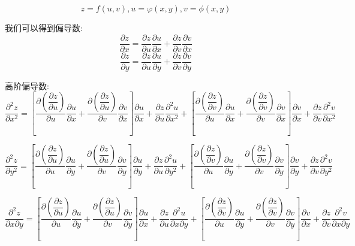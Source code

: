 \begin{definition}[链式法则]\label{def: 链式法则}
	$$z=f(u,v),u=\varphi(x,y),v=\phi(x,y)$$
	
	我们可以得到偏导数: 
	$$\dfrac{\partial z}{\partial x}=\dfrac{\partial z}{\partial u}\dfrac{\partial u}{\partial x}+\dfrac{\partial z}{\partial v}\dfrac{\partial v}{\partial x}$$
	$$\dfrac{\partial z}{\partial y}=\dfrac{\partial z}{\partial u}\dfrac{\partial u}{\partial y}+\dfrac{\partial z}{\partial v}\dfrac{\partial v}{\partial y}$$
	
	高阶偏导数: 
	$$\dfrac{\partial^2 z}{\partial x^2}=\left[\dfrac{\partial (\dfrac{\partial z}{\partial u})}{\partial u}\dfrac{\partial u}{\partial x}+\dfrac{\partial (\dfrac{\partial z}{\partial u})}{\partial v}\dfrac{\partial v}{\partial x}\right]\dfrac{\partial u}{\partial x}+
	\dfrac{\partial z}{\partial u}\frac{\partial ^2u}{\partial x^2}+
	\left[\dfrac{\partial (\dfrac{\partial z}{\partial v})}{\partial u}\dfrac{\partial u}{\partial x}+\dfrac{\partial (\dfrac{\partial z}{\partial v})}{\partial v}\dfrac{\partial v}{\partial x}\right]\dfrac{\partial v}{\partial x}+
	\dfrac{\partial z}{\partial v}\frac{\partial ^2v}{\partial x^2}$$
	
	$$\dfrac{\partial^2 z}{\partial y^2}=\left[\dfrac{\partial (\dfrac{\partial z}{\partial u})}{\partial u}\dfrac{\partial u}{\partial y}+\dfrac{\partial (\dfrac{\partial z}{\partial u})}{\partial v}\dfrac{\partial v}{\partial y}\right]\dfrac{\partial u}{\partial y}+
	\dfrac{\partial z}{\partial u}\dfrac{\partial ^2u}{\partial y^2}+
	\left[\dfrac{\partial (\dfrac{\partial z}{\partial v})}{\partial u}\dfrac{\partial u}{\partial y}+\dfrac{\partial (\dfrac{\partial z}{\partial v})}{\partial v}\dfrac{\partial v}{\partial y}\right]\dfrac{\partial v}{\partial y}+
	\dfrac{\partial z}{\partial v}\dfrac{\partial ^2v}{\partial y^2}$$
	
	$$\dfrac{\partial^2 z}{\partial x\partial y}=\left[\dfrac{\partial (\dfrac{\partial z}{\partial u})}{\partial u}\dfrac{\partial u}{\partial y}+\dfrac{\partial (\dfrac{\partial z}{\partial u})}{\partial v}\dfrac{\partial v}{\partial y}\right]\frac{\partial u}{\partial x}+
	\dfrac{\partial z}{\partial u}\dfrac{\partial ^2u}{\partial x\partial y}+
	\left[\dfrac{\partial (\dfrac{\partial z}{\partial v})}{\partial u}\dfrac{\partial u}{\partial y}+\dfrac{\partial (\dfrac{\partial z}{\partial v})}{\partial v}\dfrac{\partial v}{\partial y}\right]\dfrac{\partial v}{\partial x}+
	\dfrac{\partial z}{\partial v}\dfrac{\partial ^2v}{\partial x\partial y}$$


\end{definition}
